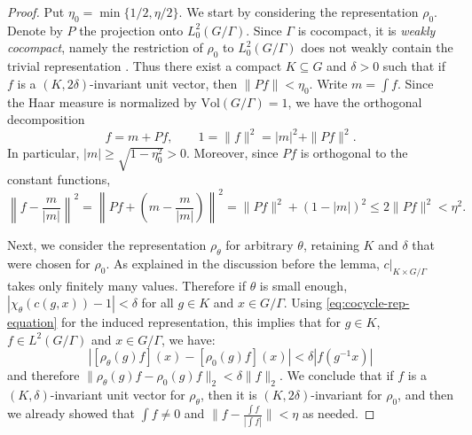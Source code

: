 \documentclass[12pt,reqno]{amsart}
\theoremstyle{definition}
\newcommand{\abs}[1]{\left| #1 \right|}
\begin{document}
\begin{proof}
    Put $\eta_0=\min\{1/2,\eta/2\}$. We start by considering the representation $\rho_0$. Denote by $P$ the projection onto $L^2_0(G/\Gamma)$. Since $\Gamma$ is cocompact, it is \emph{weakly cocompact}, namely the restriction of $\rho_0$ to $L^2_0(G/\Gamma)$ does not weakly contain the trivial representation \cite[Corollary~III.1.10]{Margulis}. Thus there exist a compact $K \subseteq G$ and $\delta>0$ such that if $f$ is a $(K,2\delta)$-invariant unit vector, then $\|Pf\| < \eta_0$. Write $m=\int f$. Since the Haar measure is normalized by $\mathrm{Vol}(G/\Gamma)=1$, we have the orthogonal decomposition
    \[
        f=m+Pf,\qquad 1=\|f\|^2=|m|^2+\|Pf\|^2.
    \]
    In particular, $|m|\geq\sqrt{1-\eta_0^2}>0$. Moreover,
    since $Pf$ is orthogonal to the constant functions,
    \[
        \left\|f-\frac{m}{|m|}\right\|^2
        =
        \left\|Pf+\left(m-\frac{m}{|m|}\right)\right\|^2
        =
        \|Pf\|^2+(1-|m|)^2
        \leq
        2\|Pf\|^2
        < \eta^2.
    \]

    Next, we consider the representation $\rho_\theta$ for arbitrary $\theta$, retaining $K$ and $\delta$ that were chosen for $\rho_0$. As explained in the discussion before the lemma, $c|_{K\times G/\Gamma}$ takes only finitely many values. Therefore if $\theta$ is small enough, $|\chi_\theta(c(g,x))-1| <  \delta$ for all $g\in K$ and $x \in G/\Gamma$. Using \eqref{eq:cocycle-rep-equation} for the induced representation, this implies that for $g \in  K$, $f \in L^2(G/\Gamma)$ and $x \in G/\Gamma$, we have:
    $$|[\rho_\theta(g)f](x) - [\rho_0(g)f](x)|< \delta\abs{f(g^{-1}x)}$$
    and therefore $\|\rho_\theta(g)f - \rho_0(g)f\|_2 < \delta \|f\|_2$. We conclude that if $f$ is a $(K,\delta)$-invariant unit vector for $\rho_\theta$, then it is $(K,2\delta)$-invariant for $\rho_0$, and then we already showed that $\int f\ne0$ and $\|f - \frac{\int f}{\abs{\int{f}}}\| < \eta$ as needed.
\end{proof}
\end{document}
